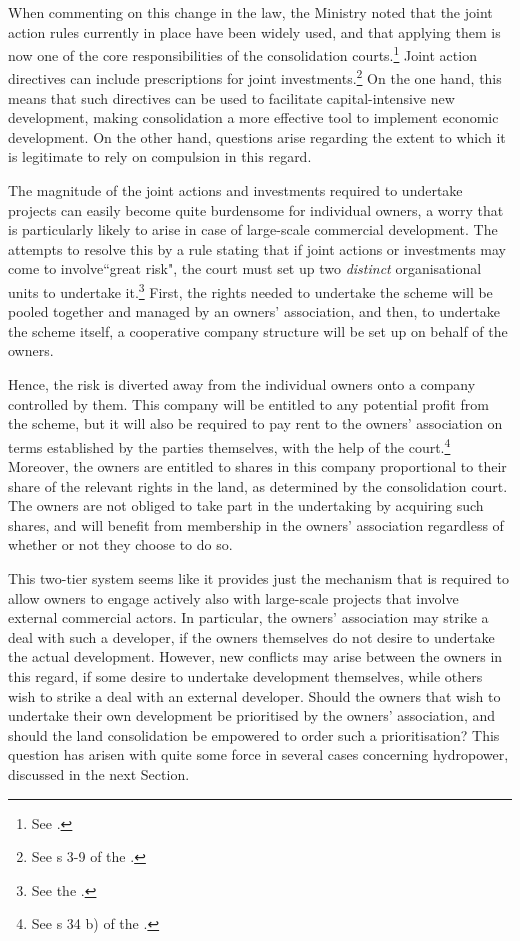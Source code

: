 When commenting on this change in the law, the Ministry noted that the joint action rules currently in place have been widely used, and that applying them is now one of the core responsibilities of the consolidation courts.\footnote{See \cite[146]{prop12}.} Joint action directives can include prescriptions for joint investments.\footnote{See s 3-9 of the \cite{lca13}.} On the one hand, this means that such directives can be used to facilitate capital-intensive new development, making consolidation a more effective tool to implement economic development. On the other hand, questions arise regarding the extent to which it is legitimate to rely on compulsion in this regard.

The magnitude of the joint actions and investments required to undertake projects can easily become quite burdensome for individual owners, a worry that is particularly likely to arise in case of large-scale commercial development. The \cite{lca79} attempts to resolve this by a rule stating that if joint actions or investments may come to involve``great risk", the court must set up two \emph{distinct} organisational units to undertake it.\footnote{See the \cite[34 b)|42]{lca79}.} First, the rights needed to undertake the scheme will be pooled together and managed by an owners' association, and then, to undertake the scheme itself, a cooperative company structure will be set up on behalf of the owners. 

Hence, the risk is diverted away from the individual owners onto a company controlled by them. This company will be entitled to any potential profit from the scheme, but it will also be required to pay rent to the owners' association on terms established by the parties themselves, with the help of the court.\footnote{See s 34 b) of the \cite{lca79}.} Moreover, the owners are entitled to shares in this company proportional to their share of the relevant rights in the land, as determined by the consolidation court. The owners are not obliged to take part in the undertaking by acquiring such shares, and will benefit from membership in the owners' association regardless of whether or not they  choose to do so. 

This two-tier system seems like it provides just the mechanism that is required to allow owners to engage actively also with large-scale projects that involve external commercial actors. In particular, the owners' association may strike a deal with such a developer, if the owners themselves do not desire to undertake the actual development. However, new conflicts may arise between the owners in this regard, if some desire to undertake development themselves, while others wish to strike a deal with an external developer. Should the owners that wish to undertake their own development be prioritised by the owners' association, and should the land consolidation be empowered to order such a prioritisation? This question has arisen with quite some force in several cases concerning hydropower, discussed in the next Section.

